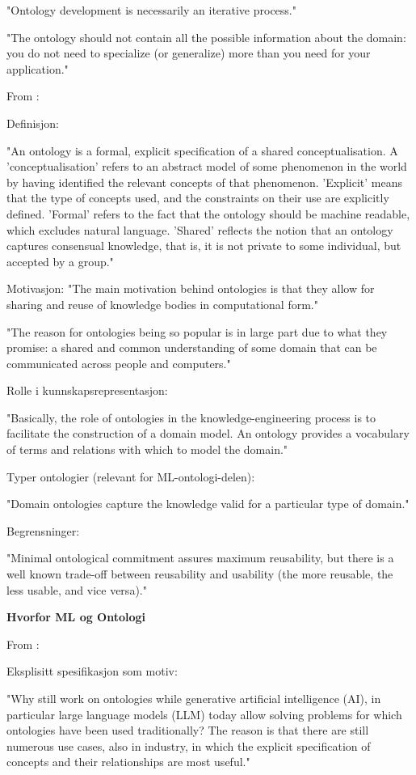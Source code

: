 "Ontology development is necessarily an iterative process."

"The ontology should not contain all the possible information about the domain: you do not need to specialize (or generalize) more than you need for your application."

From \parencite{studer1998knowledge_engineering_principles_methods} :

Definisjon:

"An ontology is a formal, explicit specification of a shared conceptualisation. A 'conceptualisation' refers to an abstract model of some phenomenon in the world by having identified the relevant concepts of that phenomenon. 'Explicit' means that the type of concepts used, and the constraints on their use are explicitly defined. 'Formal' refers to the fact that the ontology should be machine readable, which excludes natural language. 'Shared' reflects the notion that an ontology captures consensual knowledge, that is, it is not private to some individual, but accepted by a group."

Motivasjon:
"The main motivation behind ontologies is that they allow for sharing and reuse of knowledge bodies in computational form."

"The reason for ontologies being so popular is in large part due to what they promise: a shared and common understanding of some domain that can be communicated across people and computers."

Rolle i kunnskapsrepresentasjon:

"Basically, the role of ontologies in the knowledge-engineering process is to facilitate the construction of a domain model. An ontology provides a vocabulary of terms and relations with which to model the domain."

Typer ontologier (relevant for ML-ontologi-delen):

"Domain ontologies capture the knowledge valid for a particular type of domain."

Begrensninger:

"Minimal ontological commitment assures maximum reusability, but there is a well known trade-off between reusability and usability (the more reusable, the less usable, and vice versa)."


\textbf{Hvorfor ML og Ontologi}

From \parencite{humm2026industry_ready_machine_learning_ontology} :

Eksplisitt spesifikasjon som motiv:

"Why still work on ontologies while generative artificial intelligence (AI), in particular large language models (LLM) today allow solving problems for which ontologies have been used traditionally? The reason is that there are still numerous use cases, also in industry, in which the explicit specification of concepts and their relationships are most useful."

